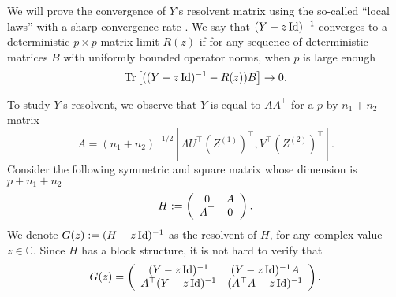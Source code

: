 We will prove the convergence of $Y$'s resolvent matrix using the so-called ``local laws'' with a sharp convergence rate \cite{isotropic,erdos2017dynamical,Anisotropic}.
We say that $(Y-z\operatorname{Id})^{-1}$ converges to a deterministic $p\times p$ matrix limit $R(z)$ if for any sequence of deterministic matrices $B$ with uniformly bounded operator norms, when $p$ is large enough
$$\operatorname{Tr}\left[((Y-z\operatorname{Id})^{-1}-R(z))B\right]\to 0.$$

To study $Y$'s resolvent, we observe that $Y$ is equal to $A A^{\top}$ for a $p$ by $n_1 + n_2$ matrix
	\[ A = (n_1+ n_2)^{-1/2} [\Lambda U^\top (Z^{(1)})^\top,V^\top (Z^{(2)})^\top]. \]
Consider the following symmetric and square matrix whose dimension is $p + n_1 + n_2$
 \begin{equation}\label{linearize_block}
    H \define \left( {\begin{array}{*{20}c}
   0 & A  \\
   A^{\top} & 0
   \end{array}} \right).
 \end{equation}
We denote $G(z) := (H - z\operatorname{Id})^{-1}$ as the resolvent of $H$, for any complex value $z\in \mathbb C$.
Since $H$ has a block structure, it is not hard to verify that
	\begin{equation*} %
	  G(z) =  \left( {\begin{array}{*{20}c}
			(Y - z\id)^{-1} & (Y - z\id)^{-1} A  \\
      A^\top (Y - z\id)^{-1} & (A^\top A - z\id)^{-1}
		\end{array}} \right).%
  \end{equation*}

